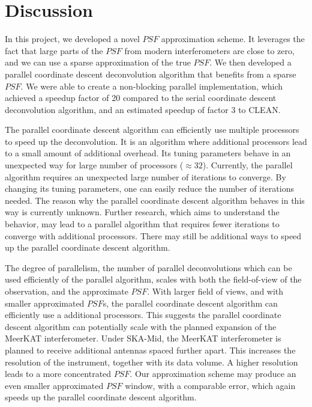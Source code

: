 \section{Discussion}\label{discussion}
In this project, we developed a novel $PSF$ approximation scheme. It leverages the fact that large parts of the $PSF$ from modern interferometers are close to zero, and we can use a sparse approximation of the true $PSF$. We then developed a parallel coordinate descent deconvolution algorithm that benefits from a sparse $PSF$.  We were able to create a non-blocking parallel implementation, which achieved a speedup factor of 20 compared to the serial coordinate descent deconvolution algorithm, and an estimated speedup of factor 3 to CLEAN.

The parallel coordinate descent algorithm can efficiently use multiple processors to speed up the deconvolution. It is an algorithm where additional processors lead to a small amount of additional overhead. Its tuning parameters behave in an unexpected way for large number of processors ($\approx 32$). Currently, the parallel algorithm requires an unexpected large number of iterations to converge. By changing its tuning parameters, one can easily reduce the number of iterations needed. The reason why the parallel coordinate descent algorithm behaves in this way is currently unknown. Further research, which aims to understand the behavior, may lead to a parallel algorithm that requires fewer iterations to converge with additional processors. There may still be additional ways to speed up the parallel coordinate descent algorithm.

The degree of parallelism, the number of parallel deconvolutions which can be used efficiently of the parallel algorithm, scales with both the field-of-view of the observation, and the approximate $PSF$. With larger field of views, and with smaller approximated $PSF$s, the parallel coordinate descent algorithm can efficiently use a additional processors. This suggests the parallel coordinate descent algorithm can potentially scale with the planned expansion of the MeerKAT interferometer. Under SKA-Mid, the MeerKAT interferometer is planned to receive additional antennas spaced further apart. This increases the resolution of the instrument, together with its data volume. A higher resolution leads to a more concentrated $PSF$. Our approximation scheme may produce an even smaller approximated $PSF$ window, with a comparable error, which again speeds up the parallel coordinate descent algorithm.

